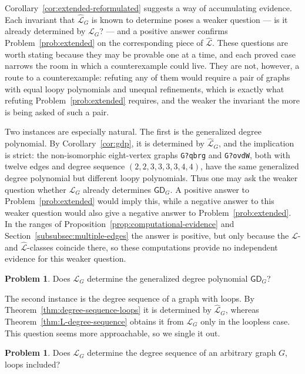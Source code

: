 \documentclass[11pt]{article}
\theoremstyle{plain}
\theoremstyle{definition}
\newtheorem{problem}[theorem]{Problem}
\renewcommand{\mathcal}{\mathscr}
\newcommand{\LL}{\mathcal{L}}    %
\newcommand{\GD}{\mathsf{GD}}    %
\numberwithin{equation}{section}
\begin{document}
Corollary~\ref{cor:extended-reformulated} suggests a way of accumulating
evidence.  Each invariant that $\widehat{\LL}_G$ is known to determine poses
a weaker question --- is it already determined by $\LL_G$? --- and a positive answer confirms Problem~\ref{prob:extended} on the corresponding piece of $\widehat{\LL}$.
These questions are worth stating because they may be provable one at a time,
and each proved case narrows the room in which a counterexample could live.
They are not, however, a route to a counterexample:
refuting any of them would require a pair of graphs with
equal loopy polynomials and unequal refinements, which is exactly what refuting
Problem~\ref{prob:extended} requires, and the weaker the invariant the more is being asked of such a pair.

Two instances are especially natural.  The first is the generalized degree polynomial.
By Corollary~\ref{cor:gdp}, it is determined by $\widehat{\LL}_G$, and the implication is strict:
the non-isomorphic eight-vertex graphs \texttt{G?qbrg} and \texttt{G?ovdW}, both with twelve
edges and degree sequence $(2,2,3,3,3,3,4,4)$, have the same generalized
degree polynomial but different loopy polynomials.  Thus one may ask the
weaker question whether $\LL_G$ already determines $\GD_G$.  A positive
answer to Problem~\ref{prob:extended} would imply this, while a negative
answer to this weaker question would also give a negative answer to
Problem~\ref{prob:extended}.  In the ranges of
Proposition~\ref{prop:computational-evidence} and
Section~\ref{subsubsec:multiple-edges} the answer is positive, but only
because the $\LL$- and $\widehat{\LL}$-classes coincide there, so these
computations provide no independent evidence for this weaker question.

\begin{problem}\label{prob:L-gdp}
  Does $\LL_G$ determine the generalized degree polynomial $\GD_G$?
\end{problem}


The second instance is the degree sequence of a graph with loops.  By
Theorem~\ref{thm:degree-sequence-loops} it is determined by
$\widehat{\LL}_G$, whereas Theorem~\ref{thm:L-degree-sequence} obtains it
from $\LL_G$ only in the loopless case.  This question seems more
approachable, so we single it out.

\begin{problem}\label{prob:loop-degree}
Does $\LL_G$ determine the degree sequence of an arbitrary graph $G$, loops included?
\end{problem}
\end{document}
